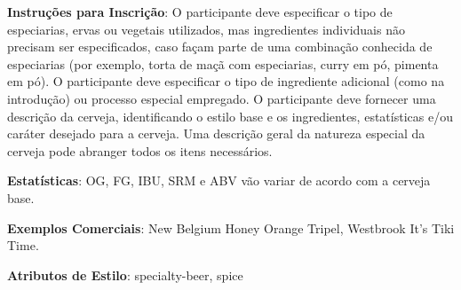 \textbf{Instruções para Inscrição}: O participante deve especificar o tipo de especiarias, ervas ou vegetais utilizados, mas ingredientes individuais não precisam ser especificados, caso façam parte de uma combinação conhecida de especiarias (por exemplo, torta de maçã com especiarias, curry em pó, pimenta em pó). O participante deve especificar o tipo de ingrediente adicional (como na introdução) ou processo especial empregado. O participante deve fornecer uma descrição da cerveja, identificando o estilo base e os ingredientes, estatísticas e/ou caráter desejado para a cerveja. Uma descrição geral da natureza especial da cerveja pode abranger todos os itens necessários.

\textbf{Estatísticas}: OG, FG, IBU, SRM e ABV vão variar de acordo com a cerveja base.

\textbf{Exemplos Comerciais}: New Belgium Honey Orange Tripel, Westbrook It's Tiki Time.

\textbf{Atributos de Estilo}: specialty-beer, spice
